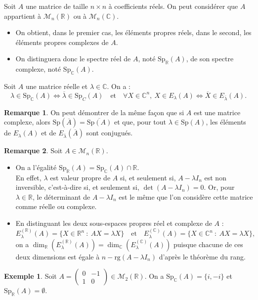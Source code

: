 \documentclass[french]{article}
\newcommand{\R}{\mathbb{R}}
\newcommand{\C}{\mathbb{C}}
\newcommand{\rg}{\text{rg}}
\newcommand{\Sp}{\text{Sp}}
\theoremstyle{plain}
\theoremstyle{definition}
\newtheorem*{ex}{Exemple}
\newtheorem*{rmq}{Remarque}
\theoremstyle{remark}
\begin{document}
	Soit $A$ une matrice de taille $n\times n$ à coefficients réels. On peut considérer que $A$ appartient à $\mathcal{M}_n(\R)$ ou à $\mathcal{M}_n(\C)$.
	\begin{itemize}
		\item On obtient, dans le premier cas, les éléments propres réels, dans le second, les éléments propres complexes de $A$.
		\item On distinguera donc le spectre réel de $A$, noté $\Sp_\R(A)$, de son spectre complexe, noté $\Sp_\C(A)$.
	\end{itemize}
	
	\begin{prop}{}%
		Soit $A$ une matrice réelle et $\lambda\in\C$. On a :
		$$\lambda\in\Sp_\C(A)\iff\overline{\lambda}\in\Sp_C(A)\quad\text{et}\quad \forall X\in\C^n,\ X\in E_\lambda(A)\iff\overline{X}\in E_{\overline{\lambda}}(A).$$
	\end{prop}
	
	\begin{rmq}
		On peut démontrer de la même façon que si $A$ est une matrice complexe, alors $\Sp(\overline{A})=\overline{\Sp(A)}$ et que, pour tout $\lambda\in\Sp(A)$, les éléments de $E_\lambda(A)$ et de $E_{\overline{\lambda}}(\overline{A})$ sont conjugués.
	\end{rmq}
	
	\begin{rmq}
		Soit $A\in\mathcal{M}_n(\R)$.
		\begin{itemize}
			\item On a l'égalité $\Sp_\R(A)=\Sp_\C(A)\cap\R$. \\
			En effet, $\lambda$ est valeur propre de $A$ si, et seulement si, $A-\lambda I_n$ est non inversible, c'est-à-dire si, et seulement si, $\det(A-\lambda I_n)=0$. Or, pour $\lambda\in\R$, le déterminant de $A-\lambda I_n$ est le même que l'on considère cette matrice comme réelle ou complexe.
			\item En distinguant les deux sous-espaces propres réel et complexe de $A$ : $$E_\lambda^{(\R)}(A)=\{X\in\R^n\ :\ AX=\lambda X\}\quad\text{et}\quad E_\lambda^{(\C)}(A)=\{X\in\C^n\ :\ AX=\lambda X\},$$ on a $\dim_\R(E_\lambda^{(\R)}(A))=\dim_\C(E_\lambda^{(\C)}(A))$ puisque chacune de ces deux dimensions est égale à $n-\rg(A-\lambda I_n)$ d'après le théorème du rang.
		\end{itemize}
	\end{rmq}
	
	\begin{ex}
		Soit $A=\displaystyle\begin{pmatrix}
			0&-1\\
			1&0
		\end{pmatrix}\in\mathcal{M}_2(\R)$. On a $\Sp_\C(A)=\{i,-i\}$ et $\Sp_\R(A)=\emptyset$.
	\end{ex}
	
\end{document}
